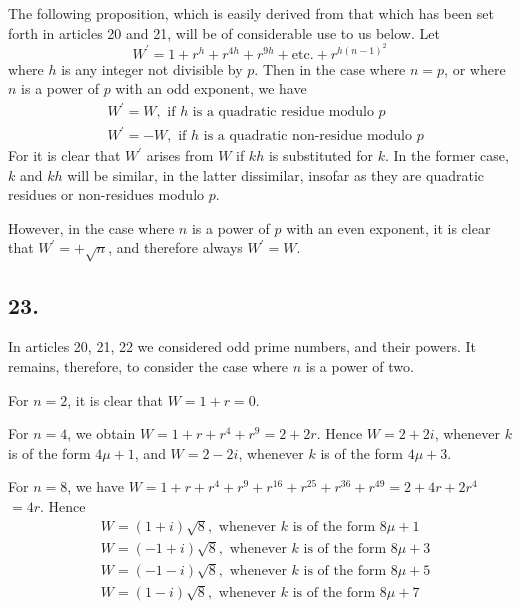 \documentclass[twoside,12pt]{memoir}
\begin{document}
The following proposition, which is easily derived from that which has been set forth in articles 20 and 21, will be of considerable use to us below. Let
\[W^{\prime}=1+r^{h}+r^{4 h}+r^{9 h}+\text{etc{.}}+r^{h(n-1)^{2}}\]
where \(h\) is any integer not divisible by \(p\).  Then in the case where \(n=p\), or where \(n\) is a power of \(p\) with an odd exponent, we have
\[\begin{aligned}
& W^{\prime}=W, \text{ if } h \text{ is a quadratic residue modulo } p \\
& W^{\prime}=-W, \text{ if } h \text{ is a quadratic non-residue modulo } p
\end{aligned}\]
For it is clear that \(W^{\prime}\) arises from \(W\) if \(kh\) is substituted for \(k\).  In the former case, \(k\) and \(kh\) will be similar, in the latter dissimilar, insofar as they are quadratic residues or non-residues modulo \(p\).

However, in the case where \(n\) is a power of \(p\) with an even exponent, it is clear that \(W^{\prime}=+\sqrt{n}\), and therefore always \(W^{\prime}=W\).
%

\subsection*{23.}
 
In articles 20, 21, 22 we considered odd prime numbers, and their powers.  It remains, therefore, to consider the case where \(n\) is a power of two.
 
For \(n=2\), it is clear that \(W=1+r=0\).
 
For \(n=4\), we obtain \(W=1+r+r^{4}+r^{9}=2+2 r\).  Hence \(W=2+2 i\), whenever \(k\) is of the form \(4 \mu+1\), and \(W=2-2 i\), whenever \(k\) is of the form \(4 \mu+3\).
 
For \(n=8\), we have \(W=1+r+r^{4}+r^{9}+r^{16}+r^{25}+r^{36}+r^{49}=2+4 r+2 r^{4}\) \(=4 r\). Hence
\[\begin{aligned}
& W=(1+i) \sqrt{8}, \text{ whenever } k \text{ is of the form } 8 \mu+1 \\
& W=(-1+i) \sqrt{8}, \text{ whenever } k \text{ is of the form } 8 \mu+3 \\
& W=(-1-i) \sqrt{8}, \text{ whenever } k \text{ is of the form } 8 \mu+5 \\
& W=(1-i) \sqrt{8}, \text{ whenever } k \text{ is of the form } 8 \mu+7
\end{aligned}\]
%
\end{document}
